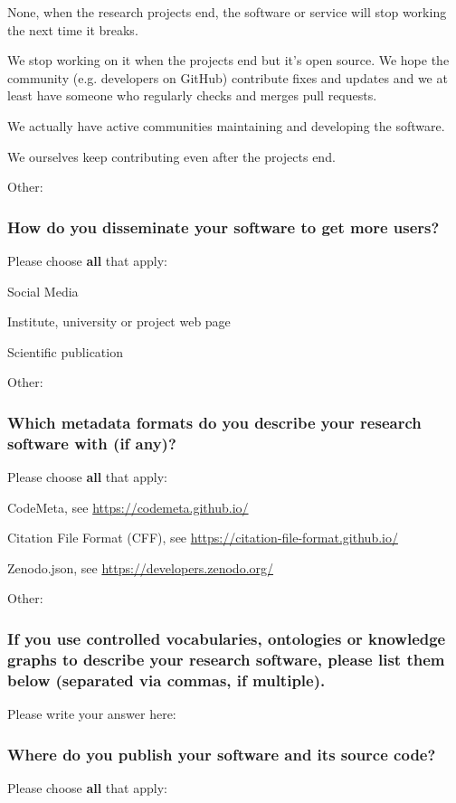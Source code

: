 \documentclass[headsepline,titlepage,twoside,12pt,toc=flat,headings=normal]{scrreprt}
\newcommand{\question}[1]{\subsubsection{#1}}
\newcommand{\otherbox}{\fbox{\phantom{This is how big an answer would be.}}}
\begin{document}
\begin{answers}
\item None, when the research projects end, the software or service will stop working the next time it breaks.
\item We stop working on it when the projects end but it's
  open source.
We hope the community (e.g. developers on GitHub)
  contribute fixes and updates and we at least have someone who
  regularly checks and merges pull requests.
\item We actually have active communities maintaining and developing the
  software.
\item We ourselves keep contributing even after the projects end.
\item Other: 
\end{answers}

\question{How do you disseminate your software to get more users?}\label{how-do-you-disseminate-your-software-to-get-more-users}
Please choose \textbf{all} that apply:

\begin{answers}
\item Social Media
\item Institute, university or project web page
\item Scientific publication
\item Other: \otherbox
\end{answers}

\question{Which metadata formats do you describe your research software with (if any)?}\label{which-metadata-formats-do-you-describe-your-research-software-with-if-any}
Please choose \textbf{all} that apply:

\begin{answers}
\item CodeMeta, see \url{https://codemeta.github.io/}
\item Citation File Format (CFF), see \url{https://citation-file-format.github.io/}
\item Zenodo.json, see \url{https://developers.zenodo.org/}
\item Other: \otherbox
\end{answers}

\question{If you use controlled vocabularies, ontologies or knowledge graphs to describe your research software, please list them below (separated via commas, if multiple).}
Please write your answer here: \otherbox

\question{Where do you publish your software and its source code?}
Please choose \textbf{all} that apply:
\end{document}
